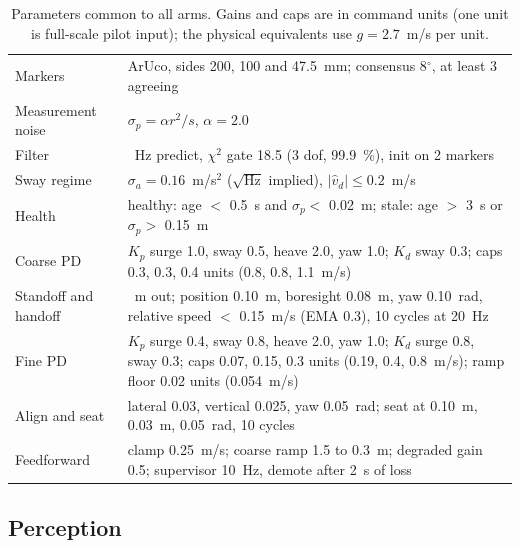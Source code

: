 \begin{table}[t]
  \caption{Parameters common to all arms. Gains and caps are in command units (one unit is full-scale pilot input); the physical equivalents use $g = 2.7$~m/s per unit.}
  \label{tab:params}
  \centering
  \footnotesize\setlength{\tabcolsep}{3pt}
  \begin{tabular}{@{}>{\raggedright\arraybackslash}p{1.85cm}>{\raggedright\arraybackslash}p{6.55cm}@{}}
    \toprule
    Markers & 9 ArUco, sides 200, 100 and 47.5~mm; consensus 8$^\circ$, at least 3 agreeing \\
    Measurement noise & $\sigma_p = \alpha r^2/s$, $\alpha = 2.0$ \\
    Filter & 30~Hz predict, $\chi^2$ gate 18.5 (3 dof, 99.9~\%), init on 2 markers \\
    Sway regime & $\sigma_a = 0.16$~m/s$^2$ ($\sqrt{\mathrm{Hz}}$ implied), $|\hat{v}_d| \le 0.2$~m/s \\
    Health & healthy: age $<$ 0.5~s and $\sigma_p <$ 0.02~m; stale: age $>$ 3~s or $\sigma_p >$ 0.15~m \\
    Coarse PD & $K_p$ surge 1.0, sway 0.5, heave 2.0, yaw 1.0; $K_d$ sway 0.3; caps 0.3, 0.3, 0.4 units (0.8, 0.8, 1.1~m/s) \\
    Standoff and handoff & 1~m out; position 0.10~m, boresight 0.08~m, yaw 0.10~rad, relative speed $<$ 0.15~m/s (EMA 0.3), 10 cycles at 20~Hz \\
    Fine PD & $K_p$ surge 0.4, sway 0.8, heave 2.0, yaw 1.0; $K_d$ surge 0.8, sway 0.3; caps 0.07, 0.15, 0.3 units (0.19, 0.4, 0.8~m/s); ramp floor 0.02 units (0.054~m/s) \\
    Align and seat & lateral 0.03, vertical 0.025, yaw 0.05~rad; seat at 0.10~m, 0.03~m, 0.05~rad, 10 cycles \\
    Feedforward & clamp 0.25~m/s; coarse ramp 1.5 to 0.3~m; degraded gain 0.5; supervisor 10~Hz, demote after 2~s of loss \\
    \bottomrule
  \end{tabular}
\end{table}

\subsection{Perception}

